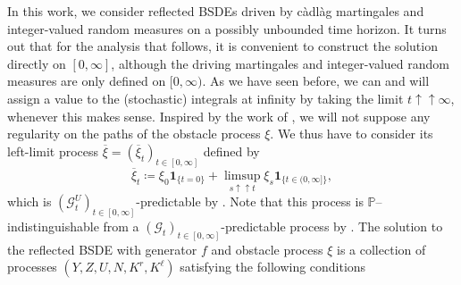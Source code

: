 \documentclass[10pt]{article} %
\newcommand\cG{\mathcal G}
\def \P{\mathbb{P}}
\newcommand{\1}{\mathbf{1}}
\begin{document}
In this work, we consider reflected BSDEs driven by c\`adl\`ag martingales and integer-valued random measures on a possibly unbounded time horizon. It turns out that for the analysis that follows, it is convenient to construct the solution directly on $[0,\infty]$, although the driving martingales and integer-valued random measures are only defined on $[0,\infty)$. As we have seen before, we can and will assign a value to the (stochastic) integrals at infinity by taking the limit $t \uparrow\uparrow \infty$, whenever this makes sense. Inspired by the work of \citeauthor*{grigorova2020optimal} \cite{grigorova2020optimal}, we will not suppose any regularity on the paths of the obstacle process $\xi$. We thus have to consider its left-limit process $\overline\xi = (\overline\xi_t)_{t \in [0,\infty]}$ defined by
\begin{equation*}
	\overline\xi_t \coloneqq
		\xi_0\mathbf{1}_{\{t = 0\}}+\limsup_{s \uparrow\uparrow t} \xi_s\mathbf{1}_{\{t\in (0,\infty]\}}, 
\end{equation*}
which is $(\cG^U_t)_{t \in [0,\infty]}$-predictable by . Note that this process is $\P$--indistinguishable from a $(\cG_t)_{t \in [0,\infty]}$-predictable process by \cite[Proposition 1.1]{jacod1979calcul}. The solution to the reflected BSDE with generator $f$ and obstacle process $\xi$ is a collection of processes $(Y,Z,U,N,K^r,K^\ell)$ satisfying the following conditions
\end{document}
